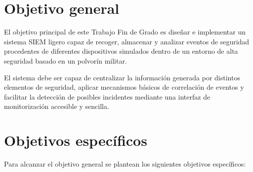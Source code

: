 
\section{Objetivo general}

El objetivo principal de este Trabajo Fin de Grado es diseñar e implementar un sistema SIEM ligero capaz de recoger, almacenar y analizar eventos de seguridad procedentes de diferentes dispositivos simulados dentro de un entorno de alta seguridad basado en un polvorín militar.

El sistema debe ser capaz de centralizar la información generada por distintos elementos de seguridad, aplicar mecanismos básicos de correlación de eventos y facilitar la detección de posibles incidentes mediante una interfaz de monitorización accesible y sencilla.

\section{Objetivos específicos}

Para alcanzar el objetivo general se plantean los siguientes objetivos específicos:

